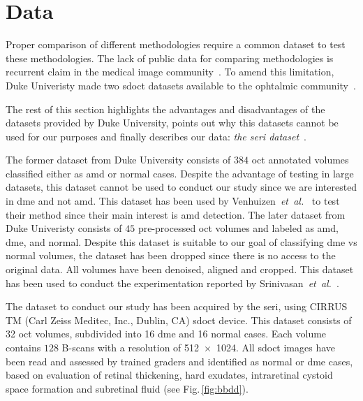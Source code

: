 \graphicspath{ {./content/method/figures/} }

\section{Data}\label{sec:data}
Proper comparison of different methodologies require a common dataset to test
these methodologies.
The lack of public data for comparing methodologies is recurrent claim in the
medical image community~\cite{giger2008anniversary}.
To amend this limitation, Duke Univeristy made two \gls{sdoct} datasets
available to the ophtalmic community~\cite{farsiu2014quantitative,Srinivasan2014}.

The rest of this section highlights the advantages and disadvantages of the
datasets provided by Duke University, points out why this datasets cannot be
used for our purposes and finally describes our data: \emph{the \gls{seri} dataset}~\cite{seri2016apr-repoICPR}.

The former dataset from Duke University consists of $384$ \gls{oct} annotated volumes classified
either as \gls{amd} or normal cases.
Despite the advantage of testing in large datasets, this dataset cannot be used to conduct our study since we are interested in \gls{dme} and not \gls{amd}.
This dataset has been used by Venhuizen~\emph{et~al.}~\cite{Venhuizen2015} to
test their method since their main interest is \gls{amd} detection.
The later dataset from Duke Univeristy consists of $45$ pre-processed \gls{oct}
volumes and labeled as \gls{amd}, \gls{dme}, and normal. Despite this dataset is
suitable to our goal of classifying \gls{dme} vs normal volumes, the dataset has
been dropped since there is no access to the original data. All volumes have
been denoised, aligned and cropped. This dataset has been used to conduct the
experimentation reported by Srinivasan~\emph{et~al.}~\cite{Srinivasan2014}.


The dataset to conduct our study has been acquired by the \gls{seri}, using CIRRUS TM (Carl Zeiss Meditec, Inc., Dublin, CA) \gls{sdoct} device.
This dataset consists of 32 \gls{oct} volumes, subdivided into 16 \gls{dme} and 16 normal cases.
Each volume contains $128$ B-scans with a resolution of \SI[product-units=repeat]{512x1024}{\px}.
All \gls{sdoct} images have been read and assessed by trained graders and identified as normal or \gls{dme} cases, based on evaluation of retinal thickening, hard exudates, intraretinal cystoid space formation and subretinal fluid (see Fig.\,\ref{fig:bbdd}).

